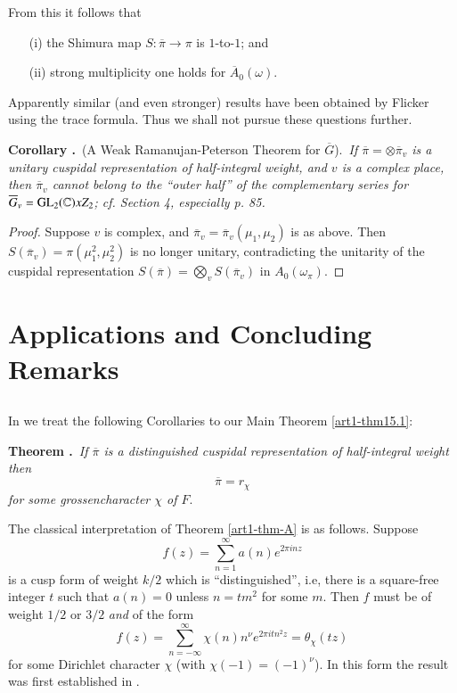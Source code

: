 From this it follows that
\begin{itemize}
\item[(i)] the Shimura map $S:\overline{\pi}\to \pi$ is $1$-to-$1$; and

\item[(ii)] strong multiplicity one holds for $\overline{A}_{0}(\omega)$.
\end{itemize}

Apparently similar (and even stronger) results have been obtained by Flicker using the trace formula. Thus we shall not pursue these questions further.

\medskip
\noindent
{\bf Corollary .\label{art1-coro15.8}}~(A Weak Ramanujan-Peterson Theorem for $\overline{G}$).~{\em If $\overline{\pi}=\otimes \overline{\pi}_{v}$ is a unitary cuspidal representation of half-integral weight, and $v$ is a complex place, then $\overline{\pi}_{v}$ cannot belong to the ``outer half'' of the complementary series for $\overline{G}_{v}=\mathrm{GL}_{2}(\mathbb{C})xZ_{2}$; cf. \cite{Ge} Section 4, especially p. 85.}

\begin{proof}
Suppose $v$ is complex, and $\overline{\pi}_{v}=\overline{\pi}_{v}(\mu_{1},\mu_{2})$ is as above. Then\pageoriginale $S(\overline{\pi}_{v})=\pi(\mu^{2}_{1},\mu^{2}_{2})$ is no longer unitary, contradicting the unitarity of the cuspidal representation $S(\overline{\pi})=\bigotimes\limits_{v}S(\overline{\pi}_{v})$ in $A_{0}(\omega_{\pi})$.
\end{proof}

\section{Applications and Concluding Remarks}\label{art1-sec16}

\subsection{}\label{art1-sec16.1}
In \cite{GePS2} we treat the following Corollaries to our Main Theorem \ref{art1-thm15.1}:

\medskip
\noindent
{\bf Theorem .\label{art1-thm-A}}~{\em If $\overline{\pi}$ is a distinguished cuspidal representation of half-integral weight then}
$$
\overline{\pi}=r_{\chi}
$$
{\em for some grossencharacter $\chi$ of $F$}.
\smallskip

The classical interpretation of Theorem \ref{art1-thm-A} is as follows. Suppose
$$
f(z)=\sum\limits^{\infty}_{n=1}a(n)e^{2\pi inz}
$$
is a cusp form of weight $k/2$ which is ``distinguished'', i.e, there is a square-free integer $t$ such that $a(n)=0$ unless $n=tm^{2}$ for some $m$. Then $f$ must be of weight $1/2$ or $3/2$ {\em and} of the form
$$
f(z)=\sum\limits^{\infty}_{n=-\infty}\chi(n)n^{\nu}e^{2\pi it n^{2}z}=\theta_{\chi}(tz)
$$
for some Dirichlet character $\chi$ (with $\chi(-1)=(-1)^{\nu}$). In this form the result was first established in \cite{Vigneras}.

